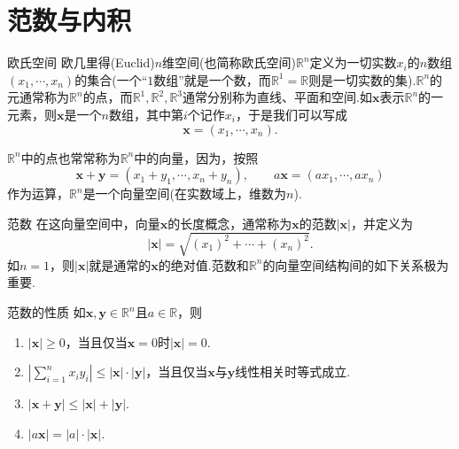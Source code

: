 \section{范数与内积}

\begin{mydefinition}{欧氏空间}
    欧几里得(Euclid)$n$维空间(也简称欧氏空间)$\mathbb{R}^n$定义为一切实数$x_i$的$n$数组$(x_1,\cdots,x_n)$的集合(一个“$1$数组”就是一个数，而$\mathbb{R}^1=\mathbb{R}$则是一切实数的集).$\mathbb{R}^n$的元通常称为$\mathbb{R}^n$的点，而$\mathbb{R}^1,\mathbb{R}^2,\mathbb{R}^3$通常分别称为直线、平面和空间.如$\mathbf{x}$表示$\mathbb{R}^n$的一元素，则$\mathbf{x}$是一个$n$数组，其中第$i$个记作$x_i$，于是我们可以写成
    $$\mathbf{x}=(x_1,\cdots,x_n).$$
\end{mydefinition}

$\mathbb{R}^n$中的点也常常称为$\mathbb{R}^n$中的向量，因为，按照
$$\mathbf{x}+\mathbf{y}=(x_1+y_1,\cdots,x_n+y_n),\qquad a\mathbf{x}=(ax_1,\cdots,ax_n)$$
作为运算，$\mathbb{R}^n$是一个向量空间(在实数域上，维数为$n$).

\begin{mydefinition}{范数}
    在这向量空间中，向量$\mathbf{x}$的长度概念，通常称为$\mathbf{x}$的范数$|\mathbf{x}|$，并定义为
    $$|\mathbf{x}|=\sqrt{(x_1)^2+\cdots+(x_n)^2}.$$
    如$n=1$，则$|\mathbf{x}|$就是通常的$\mathbf{x}$的绝对值.范数和$\mathbb{R}^n$的向量空间结构间的如下关系极为重要.
\end{mydefinition}

\begin{myTheorem}{范数的性质}
    如$\mathbf{x},\mathbf{y}\in\mathbb{R}^n$且$a\in\mathbb{R}$，则
    \begin{enumerate}
        \item $|\mathbf{x}|\geqslant 0$，当且仅当$\mathbf{x}=0$时$|\mathbf{x}|=0$.
        \item $\left|\sum_{i=1}^n x_i y_i\right|\leqslant|\mathbf{x}|\cdot|\mathbf{y}|$，当且仅当$\mathbf{x}$与$\mathbf{y}$线性相关时等式成立.
        \item $|\mathbf{x}+\mathbf{y}|\leqslant|\mathbf{x}|+|\mathbf{y}|$.
        \item $|a\mathbf{x}|=|a|\cdot|\mathbf{x}|$.
    \end{enumerate}
\end{myTheorem}

